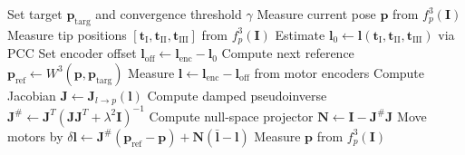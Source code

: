 \begin{algorithm}[t]
\caption{Model-based feedback controller}
\begin{algorithmic}
\State Set target $\mathbf{p}_{\mathrm{targ}}$ and convergence threshold $\gamma$
\State Measure current pose $\mathbf{p}$ from $f_p^3(\mathbf{I})$
\State Measure tip positions $[\mathbf{t}_{\mathrm{I}}, \mathbf{t}_{\mathrm{II}}, \mathbf{t}_{\mathrm{III}}]$ from $f_p^3(\mathbf{I})$
\State Estimate $\mathbf{l}_0 \gets \mathbf{l}(\mathbf{t}_{\mathrm{I}}, \mathbf{t}_{\mathrm{II}}, \mathbf{t}_{\mathrm{III}})$ via PCC
\State Set encoder offset $\mathbf{l}_{\mathrm{off}} \gets \mathbf{l}_{\mathrm{enc}} - \mathbf{l}_0$
\State Compute next reference $\mathbf{p}_{\mathrm{ref}} \gets W^3(\mathbf{p}, \mathbf{p}_{\mathrm{targ}})$
\State Measure $\mathbf{l} \gets \mathbf{l}_{\mathrm{enc}} - \mathbf{l}_{\mathrm{off}}$ from motor encoders
\State Compute Jacobian $\mathbf{J} \gets \mathbf{J}_{l \to p}(\mathbf{l})$
\State Compute damped pseudoinverse $\mathbf{J}^{\#} \gets \mathbf{J}^T (\mathbf{J}\mathbf{J}^T + \lambda^2 \mathbf{I})^{-1}$
\State Compute null-space projector $\mathbf{N} \gets \mathbf{I} - \mathbf{J}^{\#}\mathbf{J}$
\State Move motors by $\delta\mathbf{l} \gets \mathbf{J}^{\#}(\mathbf{p}_{\mathrm{ref}} - \mathbf{p}) + \mathbf{N}(\bar{\mathbf{l}} - \mathbf{l})$
\State Measure $\mathbf{p}$ from $f_p^3(\mathbf{I})$
\EndWhile
\end{algorithmic}
\end{algorithm}
